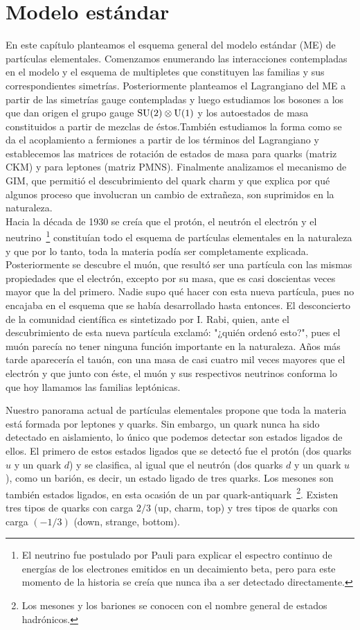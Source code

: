\chapter{Modelo estándar}
\label{ch:ME}


En este capítulo planteamos el esquema general del modelo estándar (ME) de partículas elementales. Comenzamos enumerando las interacciones contempladas en el modelo y el esquema de multipletes que constituyen las familias y sus correspondientes simetrías. Posteriormente planteamos el Lagrangiano del ME a partir de las simetrías gauge contempladas y luego estudiamos los bosones a los que dan origen el grupo gauge $\mathrm{SU}(2) \otimes \mathrm{U}(1)$ y los autoestados de masa constituidos a partir de mezclas de éstos.También estudiamos la forma como se da el acoplamiento a fermiones a partir de los términos del Lagrangiano y establecemos las matrices de rotación de estados de masa para quarks (matriz CKM) y para leptones (matriz PMNS). Finalmente analizamos el mecanismo de GIM, que permitió el descubrimiento del quark charm y que explica por qué algunos proceso que involucran un cambio de extrañeza, son suprimidos en la naturaleza.\\


Hacia la década de 1930 se creía que el protón, el neutrón el electrón y el neutrino~\footnote{El neutrino fue postulado por Pauli para explicar el espectro continuo de energías de los electrones emitidos en un decaimiento beta, pero para este momento de la historia se creía que nunca iba a ser detectado directamente.} constituían todo el esquema de partículas elementales en la naturaleza y que por lo tanto, toda la materia podía ser completamente explicada. Posteriormente se descubre el muón, que resultó ser una partícula con las mismas propiedades que el electrón, excepto por su masa, que es casi doscientas veces mayor que la del primero. Nadie supo qué hacer con esta nueva partícula, pues no encajaba en el esquema que se había desarrollado hasta entonces. El desconcierto de la comunidad científica es sintetizado por I. Rabi, quien, ante el descubrimiento de esta nueva partícula exclamó:  "¿quién ordenó esto?", pues el muón parecía no tener ninguna función importante en la naturaleza. Años más tarde aparecería el tauón, con una masa de casi cuatro mil veces mayores que el electrón y que junto con éste, el muón y sus respectivos neutrinos conforma lo que hoy llamamos las familias leptónicas.

Nuestro panorama actual de partículas elementales propone que toda la materia está formada por leptones y quarks. Sin embargo, un quark nunca ha sido detectado en aislamiento, lo único que podemos detectar son estados ligados de ellos. El primero de estos estados ligados que se detectó fue el protón (dos quarks $u$ y un quark $d$) y se clasifica, al igual que el neutrón (dos quarks $d$ y un quark $u$), como un barión, es decir, un estado ligado de tres quarks. Los mesones son también estados ligados, en esta ocasión de un par quark-antiquark~\footnote{Los mesones y los bariones se conocen con el nombre general de estados hadrónicos.}. Existen tres tipos de quarks con carga $2/3$ (up, charm, top) y tres tipos de quarks con carga $(-1/3)$ (down, strange, bottom).

